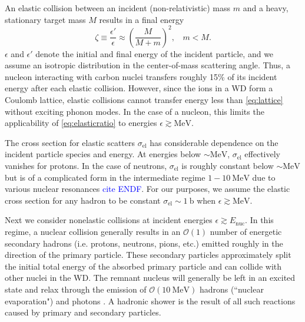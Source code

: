 \documentclass[twocolumn,showpacs,preprintnumbers,amsmath,amssymb,prd]{revtex4}
\newcommand{\OO}{\mathcal{O}}
\def\r{\right)}
\def\l{\left(}
\begin{document}
\begin{appendices}
An elastic collision between an incident (non-relativistic) mass $m$ and a heavy, stationary target mass $M$ results in a final energy
\begin{equation}
\label{eq:elasticratio}
\zeta \equiv \frac{\epsilon'}{\epsilon} \approx \l \frac{M}{M+m} \r^2, ~~~~ m < M.
\end{equation}
$\epsilon$ and $\epsilon'$ denote the initial and final energy of the incident particle, and we assume an isotropic distribution in the center-of-mass scattering angle.
Thus, a nucleon interacting with carbon nuclei transfers roughly 15\% of its incident energy after each elastic collision.
However, since the ions in a WD form a Coulomb lattice, elastic collisions cannot transfer energy less than \eqref{eq:lattice} without exciting phonon modes.
In the case of a nucleon, this limits the applicability of \eqref{eq:elasticratio} to energies $\epsilon \gtrsim \text{MeV}$.

The cross section for elastic scatters $\sigma_\text{el}$ has considerable dependence on the incident particle species and energy.
At energies below $\sim \text{MeV}$, $\sigma_\text{el}$ effectively vanishes for protons.
In the case of neutrons, $\sigma_\text{el}$ is roughly constant below $\sim \text{MeV}$ but is of a complicated form in the intermediate regime $1 - 10 ~\text{MeV}$ due to various nuclear resonances \textcolor{blue}{cite ENDF}.
For our purposes, we assume the elastic cross section for any hadron to be constant $\sigma_\text{el} \sim 1 ~\text{b}$ when $\epsilon \gtrsim \text{MeV}$.

Next we consider nonelastic collisions at incident energies $\epsilon \gtrsim E_\text{nuc}$.
In this regime, a nuclear collision generally results in an $\OO(1)$ number of energetic secondary hadrons (i.e.
protons, neutrons, pions, etc.) emitted roughly in the direction of the primary particle.
These secondary particles approximately split the initial total energy of the absorbed primary particle and can collide with other nuclei in the WD.
The remnant nucleus will generally be left in an excited state and relax through the emission of $\OO(10 ~\text{MeV})$ hadrons (``nuclear evaporation") and photons \cite{Rossi}.
A hadronic shower is the result of all such reactions caused by primary and secondary particles.


\end{appendices}
\end{document}
